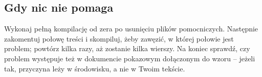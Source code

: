 \subsection{Gdy nic nie pomaga}

Wykonaj pełną kompilację od zera po usunięciu plików pomocniczych. Następnie zakomentuj połowę treści i skompiluj, żeby zawęzić, w której połowie jest problem; powtórz kilka razy, aż zostanie kilka wierszy. Na koniec sprawdź, czy problem występuje też w dokumencie pokazowym dołączonym do wzoru -- jeżeli tak, przyczyna leży w środowisku, a nie w Twoim tekście.
